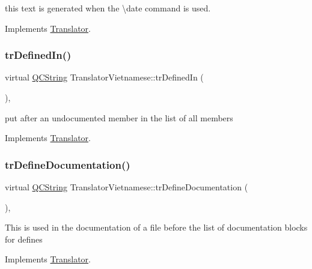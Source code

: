 this text is generated when the \textbackslash{}date command is used. 

Implements \mbox{\hyperlink{class_translator}{Translator}}.

\mbox{\label{class_translator_vietnamese_a78229e2e7d5f5e24fba04323160334af}} 
\subsubsection{\texorpdfstring{trDefinedIn()}{trDefinedIn()}}
{\footnotesize\ttfamily virtual \mbox{\hyperlink{class_q_c_string}{Q\+C\+String}} Translator\+Vietnamese\+::tr\+Defined\+In (\begin{DoxyParamCaption}{ }\end{DoxyParamCaption})\hspace{0.3cm}{\ttfamily [inline]}, {\ttfamily [virtual]}}

put after an undocumented member in the list of all members 

Implements \mbox{\hyperlink{class_translator}{Translator}}.

\mbox{\label{class_translator_vietnamese_a84b8a328ace739acc1788f176b27620a}} 
\subsubsection{\texorpdfstring{trDefineDocumentation()}{trDefineDocumentation()}}
{\footnotesize\ttfamily virtual \mbox{\hyperlink{class_q_c_string}{Q\+C\+String}} Translator\+Vietnamese\+::tr\+Define\+Documentation (\begin{DoxyParamCaption}{ }\end{DoxyParamCaption})\hspace{0.3cm}{\ttfamily [inline]}, {\ttfamily [virtual]}}

This is used in the documentation of a file before the list of documentation blocks for defines 

Implements \mbox{\hyperlink{class_translator}{Translator}}.

\mbox{\label{class_translator_vietnamese_ace7bbd9c6165a19baf08816915bd857b}} 
